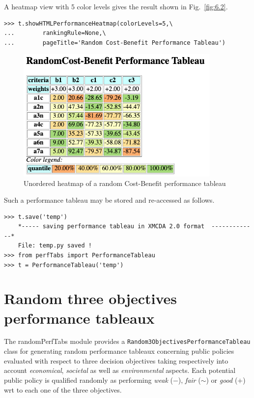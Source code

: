 A heatmap view with 5 color levels gives the result shown in Fig.~\vref{fig:6.2}.
\begin{lstlisting}
>>> t.showHTMLPerformanceHeatmap(colorLevels=5,\
...        rankingRule=None,\
...        pageTitle='Random Cost-Benefit Performance Tableau')
 \end{lstlisting}
\begin{figure}[ht]
\includegraphics[width=10cm]{Figures/6-2-randomCBHeatmap.png}
\caption{Unordered heatmap of a random Cost-Benefit performance tableau}
\label{fig:6.2}       %
\end{figure}
 
Such a performance tableau may be stored and re-accessed as follows.
\begin{lstlisting}
>>> t.save('temp')
    *----- saving performance tableau in XMCDA 2.0 format  -------------*
    File: temp.py saved !
>>> from perfTabs import PerformanceTableau
>>> t = PerformanceTableau('temp')
\end{lstlisting}

\section{Random three objectives performance tableaux}
\label{sec:6.4}

The randomPerfTabs module provides a \texttt{Random3ObjectivesPerformance\-Tableau} class for generating random performance tableaux concerning public policies evaluated with respect to three decision objectives taking respectively into account \emph{economical}, \emph{societal} as well as \emph{environmental} aspects. Each potential public policy is qualified randomly as performing \emph{weak} ($-$), \emph{fair} ($\sim$) or \emph{good} ($+$) wrt to each one of the three objectives. 

